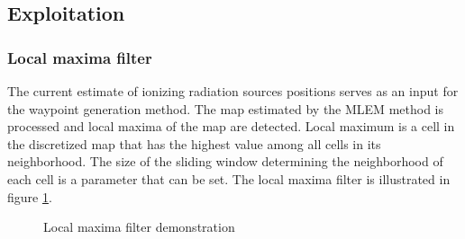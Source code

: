 \subsection{Exploitation}
\subsubsection{Local maxima filter}
The current estimate of ionizing radiation sources positions serves as an input for the waypoint generation method.
The map estimated by the \ac{MLEM} method is processed and local maxima of the map are detected.
Local maximum is a cell in the discretized map that has the highest value among all cells in its neighborhood. 
The size of the sliding window determining the neighborhood of each cell is a parameter that can be set.
The local maxima filter is illustrated in figure \ref{fig:filter}.

\begin{figure}[!htb]
  \centering
  \caption{Local maxima filter demonstration}
  \label{fig:filter}
\end{figure}%

